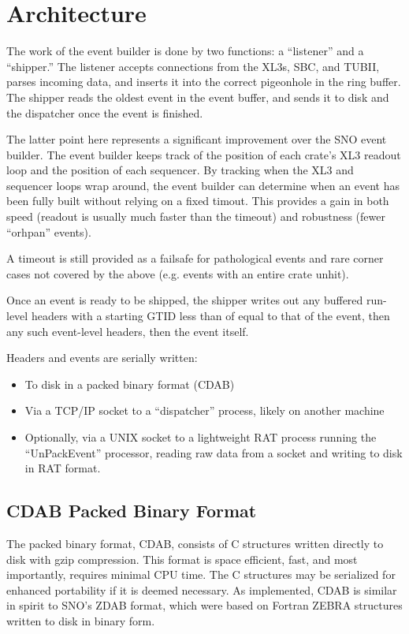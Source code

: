 \documentclass[11pt,twocolumn]{article}
\begin{document}
\section{Architecture}
The work of the event builder is done by two functions: a ``listener'' and a ``shipper.'' The listener accepts connections from the XL3s, SBC, and TUBII, parses incoming data, and inserts it into the correct pigeonhole in the ring buffer. The shipper reads the oldest event in the event buffer, and sends it to disk and the dispatcher once the event is finished.

The latter point here represents a significant improvement over the SNO event builder. The event builder keeps track of the position of each crate's XL3 readout loop and the position of each sequencer. By tracking when the XL3 and sequencer loops wrap around, the event builder can determine when an event has been fully built without relying on a fixed timout. This provides a gain in both speed (readout is usually much faster than the timeout) and robustness (fewer ``orhpan'' events).

A timeout is still provided as a failsafe for pathological events and rare corner cases not covered by the above (e.g. events with an entire crate unhit).

Once an event is ready to be shipped, the shipper writes out any buffered run-level headers with a starting GTID less than of equal to that of the event, then any such event-level headers, then the event itself.

Headers and events are serially written:
\begin{itemize}
\item To disk in a packed binary format (CDAB)
\item Via a TCP/IP socket to a ``dispatcher'' process, likely on another machine
\item Optionally, via a UNIX socket to a lightweight RAT process running the ``UnPackEvent'' processor, reading raw data from a socket and writing to disk in RAT format.
\end{itemize}

\subsection{CDAB Packed Binary Format}
The packed binary format, CDAB, consists of C structures written directly to disk with gzip compression. This format is space efficient, fast, and most importantly, requires minimal CPU time. The C structures may be serialized for enhanced portability if it is deemed necessary. As implemented, CDAB is similar in spirit to SNO's ZDAB format, which were based on Fortran ZEBRA structures written to disk in binary form.
\end{document}
